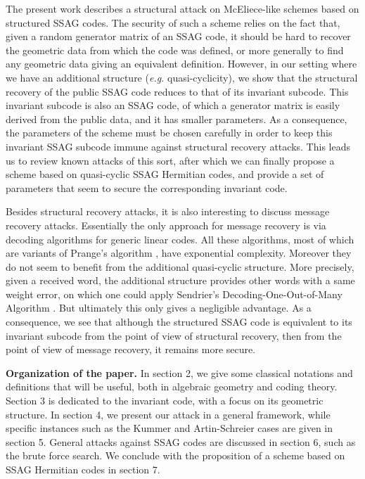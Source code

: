 \documentclass[10pt]{article}
\theoremstyle{definition}
\theoremstyle{definition}
\theoremstyle{definition}
\begin{document}
\vspace*{0.2cm}

\noindent The present work describes a structural attack on McEliece-like schemes based on structured SSAG codes.
The security of such a scheme relies on the fact that, given a random generator matrix of an SSAG code, it should be hard to recover the geometric data from which the code was defined, or more generally to find any geometric data giving an equivalent definition.
However, in our setting where we have an additional structure (\textit{e.g.} quasi-cyclicity), we show that the structural recovery of the public SSAG code reduces to that of its invariant subcode.
This invariant subcode is also an SSAG code, of which a generator matrix is easily derived from the public data, and it has smaller parameters.
As a consequence, the parameters of the scheme must be chosen carefully in order to keep this invariant SSAG subcode immune against structural recovery attacks.
This leads us to review known attacks of this sort, after which we can finally propose a scheme based on quasi-cyclic SSAG Hermitian codes, and provide a set of parameters that seem to secure the corresponding invariant code. 

\vspace*{0.2cm}

\noindent Besides structural recovery attacks, it is also interesting to discuss message recovery attacks.
Essentially the only approach for message recovery is via decoding algorithms for generic linear codes.
All these algorithms, most of which are variants of Prange's algorithm \cite{PR62}, have exponential complexity. Moreover they do not seem to benefit from the additional quasi-cyclic structure.
More precisely, given a received word, the additional structure provides other words with a same weight error, on which one could apply Sendrier's Decoding-One-Out-of-Many Algorithm \cite{DOOM}.
But ultimately this only gives a negligible advantage.
As a consequence, we see that although the structured SSAG code is equivalent to its invariant subcode from the point of view of structural recovery, then from the point of view of message recovery, it remains more secure.

\vspace*{0.2cm}

\noindent \textbf{Organization of the paper.}
In section 2, we give some classical notations and definitions that will be useful, both in algebraic geometry and coding theory. Section 3 is dedicated to the invariant code, with a focus on its geometric structure. In section 4, we present our attack in a general framework, while specific instances such as the Kummer and Artin-Schreier cases are given in section 5. General attacks against SSAG codes are discussed in section 6, such as the brute force search. We conclude with the proposition of a scheme based on SSAG Hermitian codes in section 7.
\end{document}
